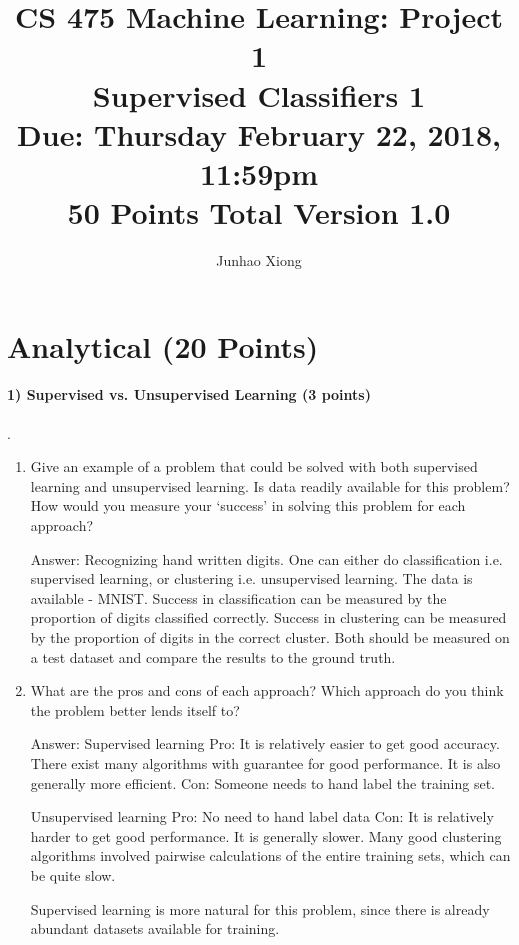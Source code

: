 \documentclass[11pt]{article}
\title{CS 475 Machine Learning: Project 1\\Supervised Classifiers 1\\
	\Large{Due: Thursday February 22, 2018, 11:59pm}\\
	50 Points Total \hspace{1cm} Version 1.0}
\author{Junhao Xiong}
\date{}
\begin{document}
	\large
	\maketitle
	\thispagestyle{headings}
	
	\vspace{-.5in}
	
	
		\section{Analytical (20 Points)}
	
	\paragraph{1) Supervised vs. Unsupervised Learning (3 points)}.
	\begin{enumerate}
		\item Give an example of a problem that could be solved with both supervised learning and unsupervised learning. Is data readily available for this problem? How would you measure your `success' in solving this problem for each approach?\newline
		
		Answer: Recognizing hand written digits. One can either do classification i.e. supervised learning, or clustering i.e. unsupervised learning. The data is available - MNIST. Success in classification can be measured by the proportion of digits classified correctly. Success in clustering can be measured by the proportion of digits in the correct cluster. Both should be measured on a test dataset and compare the results to the ground truth.
		
		\item What are the pros and cons of each approach? Which approach do you think the problem better lends itself to?\newline
		
		Answer:\newline
		Supervised learning\newline
		Pro: It is relatively easier to get good accuracy. There exist many algorithms with guarantee for good performance. It is also generally more efficient.\newline
		Con: Someone needs to hand label the training set.\newline                                                                                                           
		
		Unsupervised learning\newline                                                        
		Pro: No need to hand label data\newline
		Con: It is relatively harder to get good performance. It is generally slower. Many good clustering algorithms involved pairwise calculations of the entire training sets, which can be quite slow.\newline
		
		Supervised learning is more natural for this problem, since there is already abundant datasets available for training.
		
	\end{enumerate}
	
\end{document}
